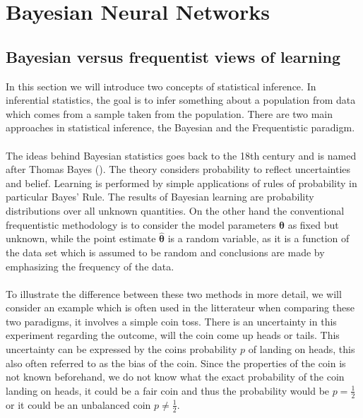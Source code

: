 \chapter{Bayesian Neural Networks}


\section{Bayesian versus frequentist views of learning}\label{sec:bayesian_stat}
In this section we will introduce two concepts of statistical inference. In inferential statistics, the goal is to infer something about a population from data which comes from a sample taken from the population. There are two main approaches in statistical inference, the Bayesian and the Frequentistic paradigm.\\ 
\\
The ideas behind Bayesian statistics goes back to the 18th century and is named after Thomas Bayes (\cite{stigler1986history}). The theory considers probability to reflect uncertainties and belief. Learning is performed by simple applications of rules of probability in particular Bayes' Rule. The results of Bayesian learning are probability distributions over all unknown quantities. On the other hand the conventional frequentistic methodology is to consider the model parameters $\boldsymbol{\theta}$ as fixed but unknown, while the point estimate $\hat{\boldsymbol{\theta}}$ is a random variable, as it is a function of the data set which is assumed to be random and conclusions are made by emphasizing the frequency of the data.
\\
\\
To illustrate the difference between these two methods in more detail, we will consider an example which is often used in the litterateur when comparing these two paradigms, it involves a simple coin toss. There is an uncertainty in this experiment regarding the outcome, will the coin come up heads or tails. This uncertainty can be expressed by the coins probability $p$ of landing on heads, this also often referred to as the bias of the coin. Since the properties of the coin is not known beforehand, we do not know what the exact probability of the coin landing on heads, it could be a fair coin and thus the probability would be $p=\frac{1}{2}$ or it could be an unbalanced coin $p\neq \frac{1}{2}$.\\
\\
